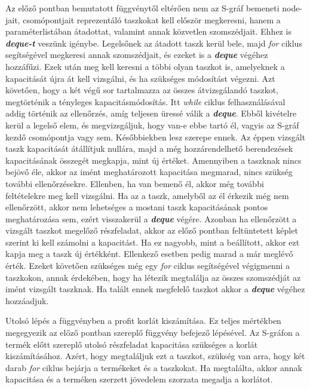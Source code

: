 Az előző pontban bemutatott függvénytől eltérően nem az S-gráf bemeneti node-jait, csomópontjait reprezentáló taszkokat kell először megkeresni, hanem a paraméterlistában átadottat, valamint annak közvetlen szomszédjait.
Ehhez is \textbf{\textit{deque-t}} veszünk igénybe.
Legelsőnek az átadott taszk kerül bele, majd \textit{for} ciklus segítségével megkeresi annak szomszédjait, és ezeket is a \textbf{\textit{deque}} végéhez hozzáfűzi.
Ezek után meg kell keresni a többi olyan taszkot is, amelyeknek a kapacitását újra át kell vizsgálni, és ha szükséges módosítást végezni.
Azt követően, hogy a két végű sor tartalmazza az összes átvizsgálandó taszkot, megtörténik a tényleges kapacitásmódosítás.
Itt \textit{while} ciklus felhasználásával addig történik az ellenőrzés, amíg teljesen üressé válik a \textbf{\textit{deque}}.
Ebből kivételre kerül a legelső elem, és megvizsgáljuk, hogy van-e ebbe tartó él, vagyis az S-gráf kezdő csomópontja vagy sem.
Későbbiekben lesz szerepe ennek.
Az éppen vizsgált taszk kapacitását átállítjuk nullára, majd a még hozzárendelhető berendezések kapacitásának összegét megkapja, mint új értéket.
Amennyiben a taszknak nincs bejövő éle, akkor az imént meghatározott kapacitása megmarad, nincs szükség további ellenőrzésekre.
Ellenben, ha van bemenő él, akkor még további feltételekre meg kell vizsgálni.
Ha az a taszk, amelyből az él érkezik még nem ellenőrzött, akkor nem lehetséges a mostani taszk kapacitásának pontos meghatározása sem, ezért visszakerül a \textbf{\textit{deque}} végére.
Azonban ha ellenőrzött a vizsgált taszkot megelőző részfeladat, akkor az előző pontban feltüntetett képlet szerint ki kell számolni a kapacitást.
Ha ez nagyobb, mint a beállított, akkor ezt kapja meg a taszk új értékként.
Ellenkező esetben pedig marad a már meglévő érték.
Ezeket követően szükséges még egy \textit{for} ciklus segítségével végigmenni a taszkokon, annak érdekében, hogy ha létezik megtalálja az összes szomszédját az imént vizsgált taszknak.
Ha talált ennek megfelelő taszkot akkor a \textbf{\textit{deque}} végéhez hozzáadjuk.

Utolsó lépés a függvényben a profit korlát kiszámítása.
Ez teljes mértékben megegyezik az előző pontban szereplő függvény befejező lépésével.
Az S-gráfon a termék előtt szereplő utolsó részfeladat kapacitása szükséges a korlát kiszámításához.
Azért, hogy megtaláljuk ezt a taszkot, szükség van arra, hogy két darab \textit{for} ciklus bejárja a termékeket és a taszkokat.
Ha megtalálta, akkor annak kapacitása és a terméken szerzett jövedelem szorzata megadja a korlátot.

